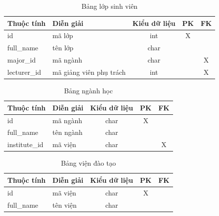     \begin{table}[h!]
      \centering
      \begin{tabular}{|l|p{}|c|c|c|}
        \hline
        \textbf{Thuộc tính} & \textbf{Diễn giải} & \textbf{Kiểu dữ liệu} & \textbf{PK} & \textbf{FK}\\
        \hline
        id & mã lớp & int & X &\\
        \hline
        full\_name & tên lớp & char & &\\
        \hline
        major\_id & mã ngành & char & & X\\
        \hline
        lecturer\_id & mã giảng viên phụ trách & int & & X\\
        \hline
      \end{tabular}
      \caption{Bảng lớp sinh viên}
    \end{table}

    \begin{table}[h!]
      \centering
      \begin{tabular}{|l|p{}|c|c|c|}
        \hline
        \textbf{Thuộc tính} & \textbf{Diễn giải} & \textbf{Kiểu dữ liệu} & \textbf{PK} & \textbf{FK}\\
        \hline
        id & mã ngành & char & X & \\
        \hline
        full\_name & tên ngành & char & &\\
        \hline
        institute\_id & mã viện & char &  & X\\
        \hline
      \end{tabular}
      \caption{Bảng ngành học}
    \end{table}

    \begin{table}[h!]
      \centering
      \begin{tabular}{|l|p{}|c|c|c|}
        \hline
        \textbf{Thuộc tính} & \textbf{Diễn giải} & \textbf{Kiểu dữ liệu} & \textbf{PK} & \textbf{FK}\\
        \hline
        id & mã viện & char & X &\\
        \hline
        full\_name & tên viện & char & &\\
        \hline
      \end{tabular}
      \caption{Bảng viện đào tạo}
    \end{table}

